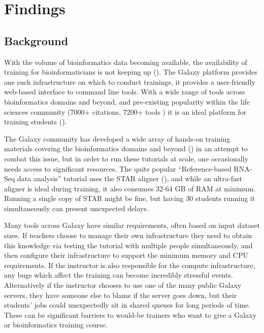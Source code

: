 \documentclass[a4paper,num-refs]{oup-contemporary}
\begin{document}
\section{Findings}
\subsection{Background}


With the volume of bioinformatics data becoming available, the availability of training for bioinformaticians is not keeping up (\cite{Attwood2017}).
The Galaxy platform \cite{afgan2018galaxy} provides one such infrastructure on which to conduct trainings, it provides a user-friendly web-based interface to command line tools. With a wide range of tools across bioinformatics domains and beyond, and pre-existing popularity within the life sciences community (7000+ citations, 7200+ tools \cite{galaxycitations,galaxytoolshed}) it is an ideal platform for training students (\cite{gtn}).

The Galaxy community has developed a wide array of hands-on training materials covering the bioinformatics domains and beyond (\cite{training-site}) in an attempt to combat this issue, but in order to run these tutorials at scale, one occasionally needs access to significant resources. The quite popular ``Reference-based RNA-Seq data analysis'' tutorial uses the STAR aligner (\cite{Dobin2012}), and while an ultra-fast aligner is ideal during training, it also consumes 32-64 GB of RAM at minimum. Running a single copy of STAR might be fine, but having 30 students running it simultaneously can present unexpected delays.

Many tools across Galaxy have similar requirements, often based on input dataset sizes. If teachers choose to manage their own infrastructure they need to obtain this knowledge via testing the tutorial with multiple people simultaneously, and then configure their infrastructure to support the minimum memory and CPU requirements. If the instructor is also responsible for the compute infrastructure, any bugs which affect the training can become incredibly stressful events. Alternatively if the instructor chooses to use one of the many public Galaxy servers, they have someone else to blame if the server goes down, but their students' jobs could unexpectedly sit in shared queues for long periods of time. These can be significant barriers to would-be trainers who want to give a Galaxy or bioinformatics training course.
\end{document}
